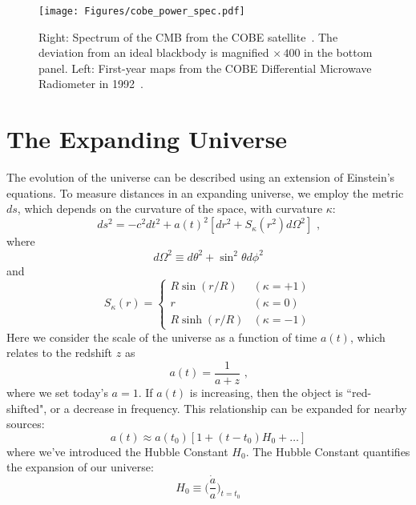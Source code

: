 \begin{figure}[t]
    \centering
    \texttt{[image: Figures/cobe\_power\_spec.pdf]}
    \caption{Right: Spectrum of the CMB from the COBE satellite~\cite{1994ApJ...420..439M}.  The deviation from an ideal blackbody is magnified $\times\,400$ in the bottom panel.  Left: First-year maps from the COBE Differential Microwave Radiometer in 1992~\cite{1992ApJ...396L...1S}.}
    \label{fig:cobe_power_spectra}
\end{figure}

\section{The Expanding Universe}
The evolution of the universe can be described using an extension of Einstein's equations.  To measure distances in an expanding universe, we employ the metric $ds$, which depends on the curvature of the space, with curvature $\kappa$:
\begin{equation}
    ds^2 = -c^2dt^2 + a(t)^2[dr^2 + S_\kappa (r^2)d\Omega^2]\text{ ,}
\end{equation}
where
\begin{equation}
    d\Omega^2\equiv d\theta^2 + \sin^2\theta d\phi^2
\end{equation}
and
\begin{equation}
    S_\kappa(r) = \begin{cases} R\sin(r/R) & (\kappa = +1) \\
  r & (\kappa = 0) \\
   R\sinh(r/R) & (\kappa = -1)\end{cases}
\end{equation}
Here we consider the scale of the universe as a function of time $a(t)$, which relates to the redshift $z$ as
\begin{equation}
    a(t) = \frac{1}{a+z}\text{ ,}
\end{equation}
where we set today's $a=1$.  If $a(t)$ is increasing, then the object is ``red-shifted", or a decrease in frequency.  This relationship can be expanded for nearby sources:
\begin{equation}
    a(t)\approx a(t_0)[1+(t-t_0)H_0+ \ldots ]
\end{equation}
where we've introduced the Hubble Constant $H_0$.  The Hubble Constant quantifies the expansion of our universe:
\begin{equation}
    H_0\equiv \bigg(\frac{\dot{a}}{a}\bigg )_{t=t_0}
\end{equation}

